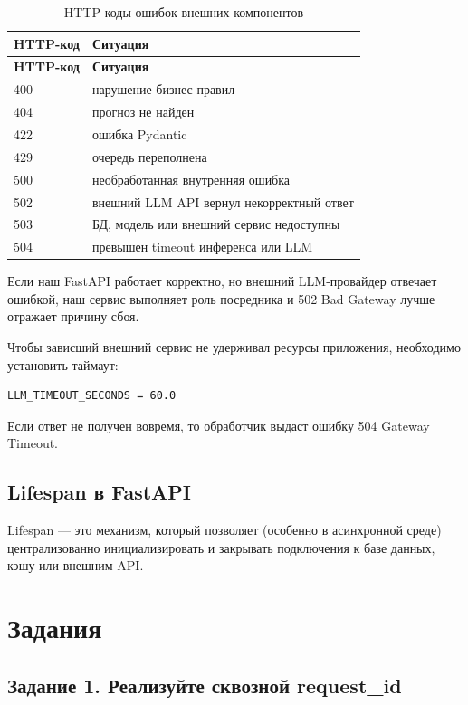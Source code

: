 \documentclass[12pt,a4paper]{article}
\begin{document}
\begin{longtable}{|p{2.5cm}|p{10.5cm}|}
\caption{HTTP-коды ошибок внешних компонентов}
\label{tab:errors}\\
\hline
\textbf{HTTP-код} & \textbf{Ситуация} \\
\hline
\endfirsthead
\hline
\textbf{HTTP-код} & \textbf{Ситуация} \\
\hline
\endhead
400 & нарушение бизнес-правил \\
404 & прогноз не найден \\
422 & ошибка Pydantic \\
429 & очередь переполнена \\
500 & необработанная внутренняя ошибка \\
502 & внешний LLM API вернул некорректный ответ \\
503 & БД, модель или внешний сервис недоступны \\
504 & превышен timeout инференса или LLM \\
\hline
\end{longtable}

Если наш FastAPI работает корректно, но внешний LLM-провайдер отвечает ошибкой, наш сервис выполняет роль посредника и 502 Bad Gateway лучше отражает причину сбоя.

Чтобы зависший внешний сервис не удерживал ресурсы приложения, необходимо установить таймаут:

\begin{lstlisting}[caption={Таймаут LLM}]
LLM_TIMEOUT_SECONDS = 60.0
\end{lstlisting}

Если ответ не получен вовремя, то обработчик выдаст ошибку 504 Gateway Timeout.

\subsection{Lifespan в FastAPI}

Lifespan — это механизм, который позволяет (особенно в асинхронной среде) централизованно инициализировать и закрывать подключения к базе данных, кэшу или внешним API.

\section{Задания}

\subsection{Задание 1. Реализуйте сквозной request\_id}
\end{document}
